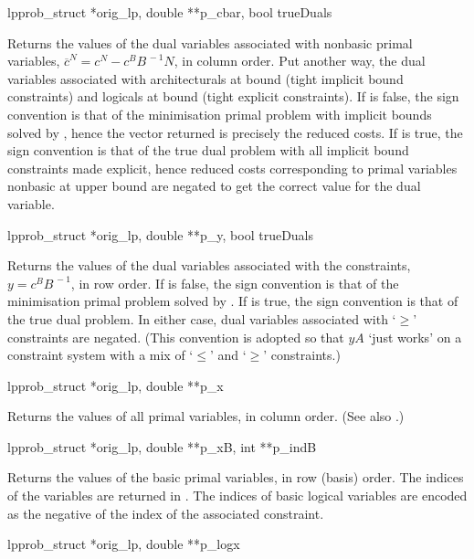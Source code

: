 \begin{subrdoc}
  \item
	  {lpprob_struct *orig_lp, double **p_cbar, bool trueDuals}

  Returns the values of the dual variables associated with nonbasic primal
  variables, $\overline{c}^N = c^N - c^B B^{\,-1}N$, in column order.
  Put another way, the dual variables associated with
  architecturals at bound (tight implicit bound constraints) and 
  logicals at bound (tight explicit constraints).
  If  is false, the sign convention is that of the
  minimisation primal problem with implicit bounds solved by \dylp,
  hence the vector returned is precisely the reduced costs.
  If  is true, the sign convention is that of the true
  dual problem with all implicit bound constraints made explicit, hence
  reduced costs corresponding to primal variables nonbasic at upper bound are
  negated to get the correct value for the dual variable.

  \item
	  {lpprob_struct *orig_lp, double **p_y, bool trueDuals}

  Returns the values of the dual variables associated with the constraints,
  $y = c^B B^{\,-1}$, in row order.
  If  is false, the sign convention is that of the
  minimisation primal problem solved by \dylp.
  If  is true, the sign convention is that of the true
  dual problem.
  In either case, dual variables associated with `$\geq$' constraints are
  negated.
  (This convention is adopted so that $yA$ `just works' on a constraint
  system with a mix of `$\leq$' and `$\geq$' constraints.)

  \item
	  {lpprob_struct *orig_lp, double **p_x}

  Returns the values of all primal variables, in column order.
  (See also .)

  \item
	  {lpprob_struct *orig_lp, double **p_xB, int **p_indB}

  Returns the values of the basic primal variables, in row (basis) order.
  The indices of the variables are returned in .
  The indices of basic logical variables are encoded as the negative of the
  index of the associated constraint.

  \item
	  {lpprob_struct *orig_lp, double **p_logx}


\end{subrdoc}
